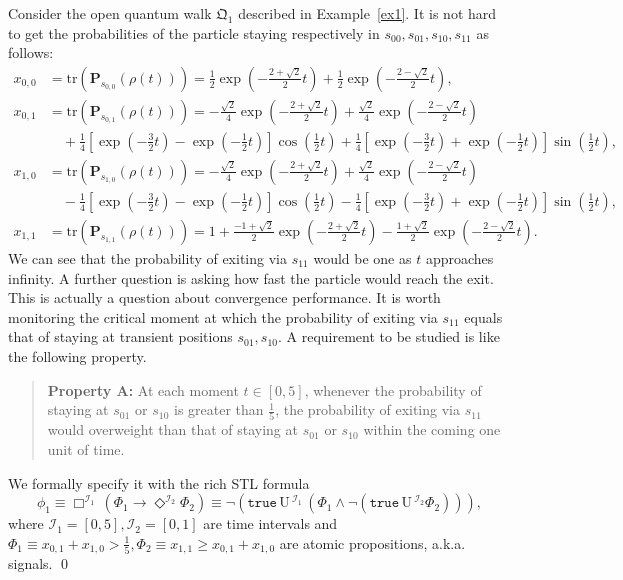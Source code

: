 \documentclass[a4paper,UKenglish,cleveref,autoref,thm-restate,authorcolumns]{lipics-v2019}
\newcommand{\QC}{\mathfrak{Q}}
\newcommand{\I}{\mathcal{I}}
\newcommand{\PP}{\mathbf{P}}
\newcommand{\tr}{\mathrm{tr}}
\newcommand{\ntl}{\mathrm{U}\,}
\newcommand{\true}{\texttt{true}}
\begin{document}
\begin{example}\label{ex2}
    Consider the open quantum walk $\QC_1$ described in Example~\ref{ex1}.
    It is not hard to get
    the probabilities of the particle staying respectively in $s_{00},s_{01},s_{10},s_{11}$ as follows:
	\begin{align*}
		x_{0,0} &= \tr(\PP_{s_{0,0}}(\rho(t)))
			= \tfrac{1}{2}\exp(-\tfrac{2+\sqrt{2}}{2}t)
			+ \tfrac{1}{2}\exp(-\tfrac{2-\sqrt{2}}{2}t), \\
		x_{0,1} &= \tr(\PP_{s_{0,1}}(\rho(t)))
			= -\tfrac{\sqrt{2}}{4}\exp(-\tfrac{2+\sqrt{2}}{2}t)
			+ \tfrac{\sqrt{2}}{4}\exp(-\tfrac{2-\sqrt{2}}{2}t) \\
			&\quad + \tfrac{1}{4}[\exp(-\tfrac{3}{2}t)-\exp(-\tfrac{1}{2}t)]\cos(\tfrac{1}{2}t) 
			+\tfrac{1}{4}[\exp(-\tfrac{3}{2}t)+\exp(-\tfrac{1}{2}t)]\sin(\tfrac{1}{2}t), \\
		x_{1,0} &= \tr(\PP_{s_{1,0}}(\rho(t)))
			= -\tfrac{\sqrt{2}}{4}\exp(-\tfrac{2+\sqrt{2}}{2}t)
			+\tfrac{\sqrt{2}}{4}\exp(-\tfrac{2-\sqrt{2}}{2}t) \\
			&\quad -\tfrac{1}{4}[\exp(-\tfrac{3}{2}t)-\exp(-\tfrac{1}{2}t)]\cos(\tfrac{1}{2}t)
			- \tfrac{1}{4}[\exp(-\tfrac{3}{2}t)+\exp(-\tfrac{1}{2}t)]\sin(\tfrac{1}{2}t), \\
		x_{1,1} &= \tr(\PP_{s_{1,1}}(\rho(t)))
    	    = 1	+\tfrac{-1+\sqrt{2}}{2}\exp(-\tfrac{2+\sqrt{2}}{2}t)
    	    -\tfrac{1+\sqrt{2}}{2}\exp(-\tfrac{2-\sqrt{2}}{2}t).
	\end{align*}
    We can see that
    the probability of exiting via $s_{11}$ would be one as $t$ approaches infinity.
    A further question is asking
    how fast the particle would reach the exit.
    This is actually a question about convergence performance.
    It is worth monitoring the critical moment
    at which the probability of exiting via $s_{11}$
    equals that of staying at transient positions $s_{01},s_{10}$.
    A requirement to be studied is like the following property.
	\begin{quote}
		\textbf{Property A:} At each moment $t\in[0,5]$,
		whenever the probability of staying at $s_{01}$ or $s_{10}$
		is greater than $\tfrac{1}{5}$,
		the probability of exiting via $s_{11}$ would overweight
		than that of staying at $s_{01}$ or $s_{10}$
		within the coming one unit of time.
	\end{quote}
	We formally specify it with the rich STL formula
	\[
		\phi_1 \equiv \Box^{\I_1}\, (\Phi_1 \rightarrow \Diamond^{\I_2} \Phi_2)
		\equiv \neg(\true\,\ntl^{\I_1}\, (\Phi_1 \wedge \neg(\true\,\ntl^{\I_2} \Phi_2))),
	\]
	where $\I_1=[0,5],\I_2=[0,1]$ are time intervals
	and $\Phi_1 \equiv x_{0,1}+x_{1,0}>\tfrac{1}{5},
	\Phi_2 \equiv x_{1,1} \ge x_{0,1}+x_{1,0}$ are atomic propositions,
	a.k.a. signals. \qed
\end{example}
\end{document}
